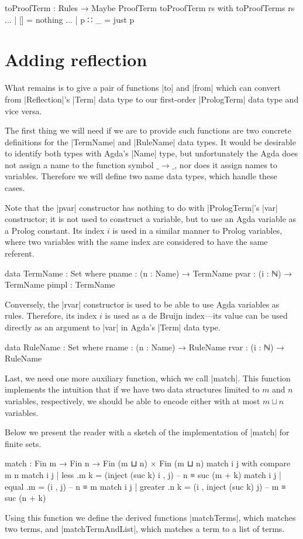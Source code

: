 \documentclass[preprint]{sigplanconf}
\begin{document}
\begin{code}
toProofTerm : Rules → Maybe ProofTerm
toProofTerm rs with toProofTerms rs
... | []     = nothing
... | p ∷ _  = just p
\end{code}



\section{Adding reflection}
\label{sec:reflection}

What remains is to give a pair of functions |to| and |from| which can
convert from |Reflection|'s |Term| data type to our first-order
|PrologTerm| data type and vice versa.

The first thing we will need if we are to provide such functions are
two concrete definitions for the |TermName| and |RuleName| data types.
It would be desirable to identify both types with Agda's |Name| type,
but unfortunately the Agda does not assign a name to the function
symbol $\_\!\!\to\!\!\_$, nor does it assign names to
variables. Therefore we will define two name data types, which handle
these cases.

Note that the |pvar| constructor has nothing to do with |PrologTerm|'s
|var| constructor; it is not used to construct a variable, but to use
an Agda variable as a Prolog constant. Its index $i$ is used in a
similar manner to Prolog variables, where two variables with the same
index are considered to have the same referent.
\begin{code}
data TermName : Set where
  pname  : (n : Name) → TermName
  pvar   : (i : ℕ) → TermName
  pimpl  : TermName
\end{code}
Conversely, the |rvar| constructor is used to be able to use Agda
variables as rules. Therefore, its index $i$ is used as a de Bruijn
index---its value can be used directly as an argument to |var| in
Agda's |Term| data type.
\begin{code}
data RuleName : Set where
  rname  : (n : Name) → RuleName
  rvar   : (i : ℕ) → RuleName
\end{code}
Last, we need one more auxiliary function, which we call |match|. This
function implements the intuition that if we have two data structures
limited to $m$ and $n$ variables, respectively, we should be able to
encode either with at most $m ⊔ n$ variables.

Below we present the reader with a sketch of the implementation of
|match| for finite sets.
\begin{code}
match : Fin m → Fin n → Fin (m ⊔ n) × Fin (m ⊔ n)
match i j with compare m n
match i j | less     .m k  = (inject (suc k) i , j)  -- n ≡ suc (m + k)
match i j | equal    .m    = (i , j)                 -- n ≡ m
match i j | greater  .n k  = (i , inject (suc k) j)  -- m ≡ suc (n + k)
\end{code}
Using this function we define the derived functions |matchTerms|,
which matches two terms, and |matchTermAndList|, which matches a term
to a list of terms.
\end{document}
